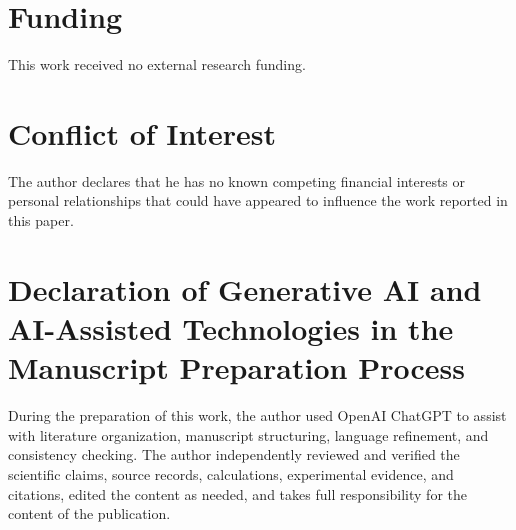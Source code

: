 \documentclass[journal]{IEEEtran}
\begin{document}
\section*{Funding}
This work received no external research funding.

\section*{Conflict of Interest}
The author declares that he has no known competing financial interests or personal relationships that could have appeared to influence the work reported in this paper.
\section*{Declaration of Generative AI and AI-Assisted Technologies in the Manuscript Preparation Process}
During the preparation of this work, the author used OpenAI ChatGPT to assist with literature organization, manuscript structuring, language refinement, and consistency checking. The author independently reviewed and verified the scientific claims, source records, calculations, experimental evidence, and citations, edited the content as needed, and takes full responsibility for the content of the publication.
\end{document}
